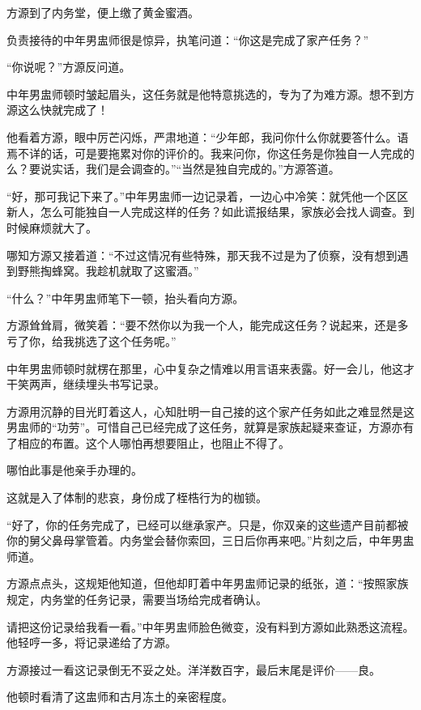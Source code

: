 
\begin{this_body}

方源到了内务堂，便上缴了黄金蜜酒。

负责接待的中年男盅师很是惊异，执笔问道：“你这是完成了家产任务？”

“你说呢？”方源反问道。

中年男盅师顿时皱起眉头，这任务就是他特意挑选的，专为了为难方源。想不到方源这么快就完成了！

他看着方源，眼中厉芒闪烁，严肃地道：“少年郎，我问你什么你就要答什么。语焉不详的话，可是要拖累对你的评价的。我来问你，你这任务是你独自一人完成的么？要说实话，我们是会调查的。”“当然是独自完成的。”方源答道。

“好，那可我记下来了。”中年男盅师一边记录着，一边心中冷笑：就凭他一个区区新人，怎么可能独自一人完成这样的任务？如此谎报结果，家族必会找人调查。到时候麻烦就大了。

哪知方源又接着道：“不过这情况有些特殊，那天我不过是为了侦察，没有想到遇到野熊掏蜂窝。我趁机就取了这蜜酒。”

“什么？”中年男盅师笔下一顿，抬头看向方源。

方源耸耸肩，微笑着：“要不然你以为我一个人，能完成这任务？说起来，还是多亏了你，给我挑选了这个任务呢。”

中年男盅师顿时就楞在那里，心中复杂之情难以用言语来表露。好一会儿，他这才干笑两声，继续埋头书写记录。

方源用沉静的目光盯着这人，心知肚明一自己接的这个家产任务如此之难显然是这男盅师的“功劳”。可惜自己已经完成了这任务，就算是家族起疑来查证，方源亦有了相应的布置。这个人哪怕再想要阻止，也阻止不得了。

哪怕此事是他亲手办理的。

这就是入了体制的悲哀，身份成了桎梏行为的枷锁。

“好了，你的任务完成了，已经可以继承家产。只是，你双亲的这些遗产目前都被你的舅父鼻母掌管着。内务堂会替你索回，三日后你再来吧。”片刻之后，中年男盅师道。

方源点点头，这规矩他知道，但他却盯着中年男盅师记录的纸张，道：“按照家族规定，内务堂的任务记录，需要当场给完成者确认。

请把这份记录给我看一看。”中年男盅师脸色微变，没有料到方源如此熟悉这流程。他轻哼一多，将记录递给了方源。

方源接过一看这记录倒无不妥之处。洋洋数百字，最后末尾是评价——良。

他顿时看清了这盅师和古月冻土的亲密程度。


\end{this_body}
